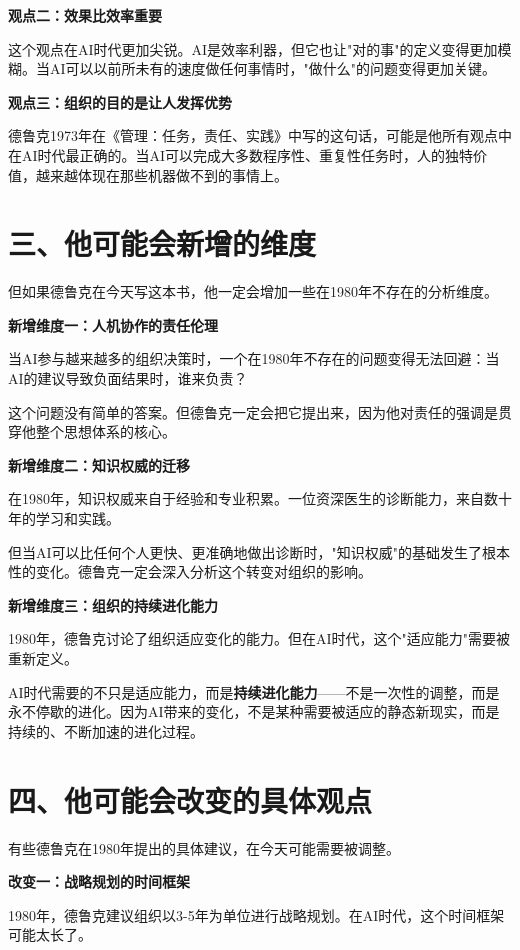 \textbf{观点二：效果比效率重要}

这个观点在AI时代更加尖锐。AI是效率利器，但它也让"对的事"的定义变得更加模糊。当AI可以以前所未有的速度做任何事情时，"做什么"的问题变得更加关键。

\textbf{观点三：组织的目的是让人发挥优势}

德鲁克1973年在《管理：任务，责任、实践》中写的这句话，可能是他所有观点中在AI时代最正确的。当AI可以完成大多数程序性、重复性任务时，人的独特价值，越来越体现在那些机器做不到的事情上。

\section{三、他可能会新增的维度}


但如果德鲁克在今天写这本书，他一定会增加一些在1980年不存在的分析维度。

\textbf{新增维度一：人机协作的责任伦理}

当AI参与越来越多的组织决策时，一个在1980年不存在的问题变得无法回避：当AI的建议导致负面结果时，谁来负责？

这个问题没有简单的答案。但德鲁克一定会把它提出来，因为他对责任的强调是贯穿他整个思想体系的核心。

\textbf{新增维度二：知识权威的迁移}

在1980年，知识权威来自于经验和专业积累。一位资深医生的诊断能力，来自数十年的学习和实践。

但当AI可以比任何个人更快、更准确地做出诊断时，"知识权威"的基础发生了根本性的变化。德鲁克一定会深入分析这个转变对组织的影响。

\textbf{新增维度三：组织的持续进化能力}

1980年，德鲁克讨论了组织适应变化的能力。但在AI时代，这个"适应能力"需要被重新定义。

AI时代需要的不只是适应能力，而是\textbf{持续进化能力}——不是一次性的调整，而是永不停歇的进化。因为AI带来的变化，不是某种需要被适应的静态新现实，而是持续的、不断加速的进化过程。

\section{四、他可能会改变的具体观点}


有些德鲁克在1980年提出的具体建议，在今天可能需要被调整。

\textbf{改变一：战略规划的时间框架}

1980年，德鲁克建议组织以3-5年为单位进行战略规划。在AI时代，这个时间框架可能太长了。

